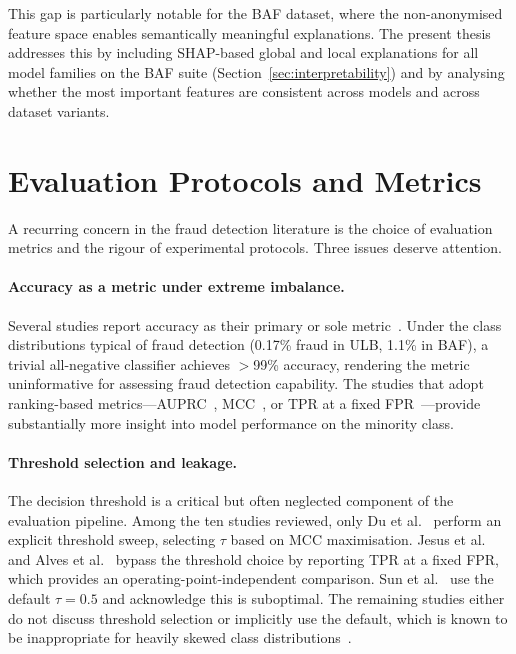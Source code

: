 This gap is particularly notable for the BAF dataset, where the non-anonymised feature space enables semantically meaningful explanations. The present thesis addresses this by including SHAP-based global and local explanations for all model families on the BAF suite (Section~\ref{sec:interpretability}) and by analysing whether the most important features are consistent across models and across dataset variants.


\section{Evaluation Protocols and Metrics}
\label{sec:rw_evaluation}

A recurring concern in the fraud detection literature is the choice of evaluation metrics and the rigour of experimental protocols. Three issues deserve attention.

\paragraph{Accuracy as a metric under extreme imbalance.}
Several studies report accuracy as their primary or sole metric~\cite{alemad2022credit, mosa2024ccfd}. Under the class distributions typical of fraud detection (0.17\% fraud in ULB, 1.1\% in BAF), a trivial all-negative classifier achieves $>$99\% accuracy, rendering the metric uninformative for assessing fraud detection capability. The studies that adopt ranking-based metrics---AUPRC~\cite{jansson2020federated}, MCC~\cite{du2024novel}, or TPR at a fixed FPR~\cite{jesus2022turning, alves2025benchmarking}---provide substantially more insight into model performance on the minority class.

\paragraph{Threshold selection and leakage.}
The decision threshold is a critical but often neglected component of the evaluation pipeline. Among the ten studies reviewed, only Du et al.~\cite{du2024novel} perform an explicit threshold sweep, selecting $\tau$ based on MCC maximisation. Jesus et al.~\cite{jesus2022turning} and Alves et al.~\cite{alves2025benchmarking} bypass the threshold choice by reporting TPR at a fixed FPR, which provides an operating-point-independent comparison. Sun et al.~\cite{sun2025objective} use the default $\tau = 0.5$ and acknowledge this is suboptimal. The remaining studies either do not discuss threshold selection or implicitly use the default, which is known to be inappropriate for heavily skewed class distributions~\cite{he2009learning}.

